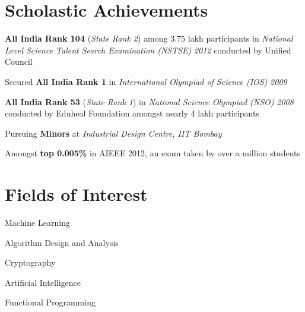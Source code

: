 \documentclass[margin,11pt]{resume}
\begin{document}
\begin{resume}
\pagebreak

\vspace{-150em}

\section{\mysidestyle Scholastic Achievements}
\begin{list2}
\item \textbf{All India Rank 104} (\textsl{State Rank 2}) among 3.75 lakh participants in \textsl{National Level Science Talent Search Examination (NSTSE)} \textsl{2012} conducted by Unified Council
\item Secured \textbf{All India Rank 1} in \textsl{International Olympiad of Science (IOS)} \textsl{2009}
\item \textbf{All India Rank 53} (\textsl{State Rank 1}) in \textsl{National Science Olympiad (NSO)} \textsl{2008} conducted by Eduheal Foundation amongst nearly 4 lakh participants
\item Pursuing \textbf{Minors} at \textsl{Industrial Design Centre, IIT Bombay}
\item Amongst \textbf{top 0.005\%} in AIEEE 2012, an exam taken by over a million students
 \end{list2}

\section{\mysidestyle Fields of Interest}
\begin{list2}
\item Machine Learning
\item Algorithm Design and Analysis
\item Cryptography
\item Artificial Intelligence
\item Functional Programming
\end{list2}


\end{resume}
\end{document}
